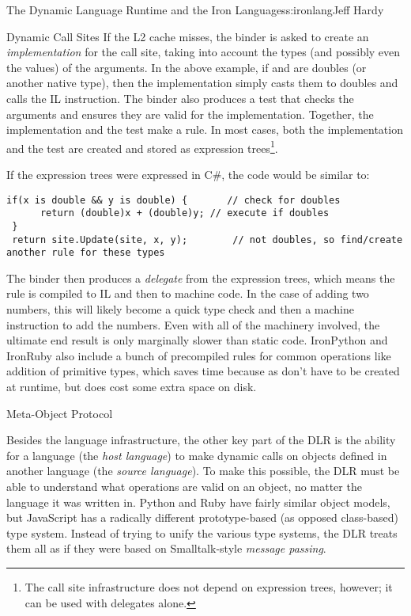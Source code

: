 \begin{aosachapter}{The Dynamic Language Runtime and the Iron Languages}{s:ironlang}{Jeff Hardy}
\begin{aosasect1}{Dynamic Call Sites}
If the L2 cache misses, the binder is asked to create an \emph{implementation}
for the call site, taking into account the types (and possibly even the values)
of the arguments. In the above example, if  and  are doubles
(or another native type), then the implementation simply casts them to doubles
and calls the IL  instruction. The binder also produces a test that
checks the arguments and ensures they are valid for the implementation.
Together, the implementation and the test make a rule. In most cases, both the
implementation and the test are created and stored as expression
trees\footnote{The call site infrastructure does not depend on expression
trees, however; it can be used with delegates alone.}.

If the expression trees were expressed in C\#, the code would be similar to:

\begin{verbatim}
if(x is double && y is double) {       // check for doubles
      return (double)x + (double)y; // execute if doubles
 }
 return site.Update(site, x, y);        // not doubles, so find/create another rule for these types
\end{verbatim}

The binder then produces a \emph{delegate} from the expression trees, which
means the rule is compiled to IL and then to machine code. In the case of
adding two numbers, this will likely become a quick type check and then a
machine instruction to add the numbers. Even with all of the machinery
involved, the ultimate end result is only marginally slower than static code.
IronPython and IronRuby also include a bunch of precompiled rules for common
operations like addition of primitive types, which saves time because as don't
have to be created at runtime, but does cost some extra space on disk.

\end{aosasect1}

\begin{aosasect1}{Meta-Object Protocol}

Besides the language infrastructure, the other key part of the DLR is the
ability for a language (the \emph{host language}) to make dynamic calls on
objects defined in another language (the \emph{source language}). To make this
possible, the DLR must be able to understand what operations are valid on an
object, no matter the language it was written in. Python and Ruby have fairly
similar object models, but JavaScript has a radically different prototype-based
(as opposed class-based) type system. Instead of trying to unify the various
type systems, the DLR treats them all as if they were based on Smalltalk-style
\emph{message passing}.


\end{aosasect1}
\end{aosachapter}

